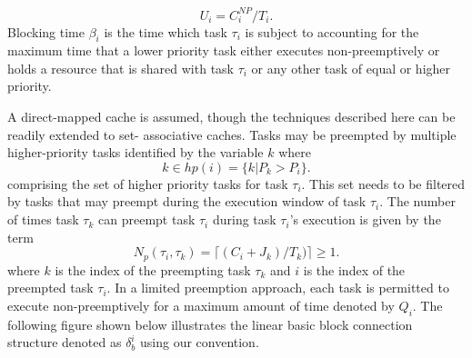 \begin{equation}\label{eqn:u-task}
    U_{i} = C_{i}^{NP}/T_{i}.
\end{equation}
\noindent
Blocking time \begin{math}\beta_{i}\end{math} is the time which task \begin{math}\tau_{i}\end{math} is subject to accounting for the maximum time that a lower priority task either executes non-preemptively or holds a resource that is shared with task \begin{math}\tau_{i}\end{math} or any other task of equal or higher priority.

A direct-mapped cache is assumed, though the techniques described here can be readily extended to set- associative caches. Tasks may be preempted by multiple higher-priority tasks identified by the variable $k$ where
\begin{equation}\label{eqn:hp-tasks}
    k \in hp(i) = \{k | P_{k} > P_{i}\}.
\end{equation}
\noindent
comprising the set of higher priority tasks for task \begin{math}\tau_{i}\end{math}.  This set needs to be filtered by tasks that may preempt during the execution window of task \begin{math}\tau_{i}\end{math}.  The number of times task \begin{math}\tau_{k}\end{math} can preempt task \begin{math}\tau_{i}\end{math} during task \begin{math}\tau_{i}\end{math}'s execution is given by the term
\begin{equation}\label{eqn:num-preemptions}
    N_{p}(\tau_{i},\tau_{k})=\lceil(C_{i} + J_{k})/T_{k})\rceil \geq 1.
\end{equation}
\noindent
where $k$ is the index of the preempting task \begin{math}\tau_{k}\end{math} and $i$ is the index of the preempted task \begin{math}\tau_{i}\end{math}.  In a limited preemption approach, each task is permitted to execute non-preemptively for a maximum amount of time denoted by \begin{math}Q_{i}\end{math}.  The following figure shown below illustrates the linear basic block connection structure denoted as \begin{math}\delta_{b}^{i}\end{math} using our convention.

